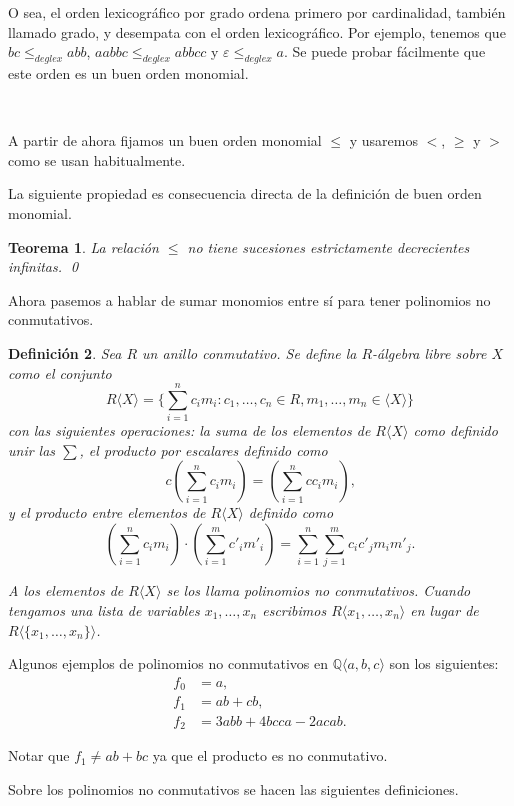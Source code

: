 \documentclass[12pt]{report}
\theoremstyle{customstyle}
\newtheorem{theorem}{Teorema}[chapter]
\newtheorem{definition}[theorem]{Definición}
\theoremstyle{factstyle}
\begin{document}
O sea, el orden lexicográfico por grado ordena primero por cardinalidad, también llamado grado, y desempata con el orden lexicográfico. Por ejemplo, tenemos que $bc ≤_{deglex} abb$, $aabbc ≤_{deglex} abbcc$ y $ε ≤_{deglex} a$. Se puede probar fácilmente que este orden es un buen orden monomial.

\

A partir de ahora fijamos un buen orden monomial $≤$ y usaremos $<$, $≥$ y $>$ como se usan habitualmente.

La siguiente propiedad es consecuencia directa de la definición de buen orden monomial.

\begin{theorem}\label{thm:≤ no sucesiones dec inf}
  La relación $≤$ no tiene sucesiones estrictamente decrecientes infinitas.
  \qed
\end{theorem}

Ahora pasemos a hablar de sumar monomios entre sí para tener polinomios no conmutativos.

\begin{definition}
  Sea $R$ un anillo conmutativo. Se define la $R$-álgebra libre sobre $X$ como el conjunto
  \[ R⟨X⟩ = \{∑_{i = 1}^n c_i m_i : c_1, …, c_n ∈ R, m_1, …, m_n ∈ ⟨X⟩\}\]
  con las siguientes operaciones: la suma de los elementos de $R⟨X⟩$ como definido unir las $∑$, el producto por escalares definido como
  \[ c (∑_{i = 1}^n c_i m_i) = (∑_{i = 1}^n c c_i m_i) \text{,}\]
  y el producto entre elementos de $R⟨X⟩$ definido como
  \[ (∑_{i = 1}^n c_i m_i) · (∑_{i = 1}^m c'_i m'_i) = ∑_{i = 1}^n ∑_{j = 1}^m c_i c'_j m_i m'_j \text{.}\]

  A los elementos de $R⟨X⟩$ se los llama polinomios no conmutativos. Cuando tengamos una lista de variables $x_1, …, x_n$ escribimos $R⟨x_1, …, x_n⟩$ en lugar de $R⟨\{x_1, …, x_n\}⟩$.
\end{definition}

Algunos ejemplos de polinomios no conmutativos en $ℚ⟨a, b, c⟩$ son los siguientes:
\begin{align*}
  f_0 &= a \text{,} \\
  f_1 &= ab + cb \text{,} \\
  f_2 &= 3 abb + 4 bcca - 2 acab \text{.}
\end{align*}

\noindent Notar que $f_1 ≠ ab + bc$ ya que el producto es no conmutativo.

Sobre los polinomios no conmutativos se hacen las siguientes definiciones.
\end{document}
